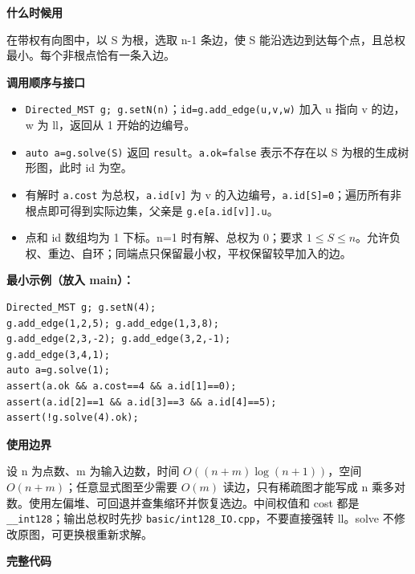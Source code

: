 \documentclass[UTF8,a4paper,10pt]{ctexart}
\newcommand{\TemplUsage}[1]{\textbf{什么时候用}\par #1\par}
\newcommand{\TemplApi}[1]{\textbf{调用顺序与接口}\par #1\par}
\newcommand{\TemplNote}[1]{\textbf{使用边界}\par #1\par}
\begin{document}
\TemplUsage{在带权有向图中，以 S 为根，选取 n-1 条边，使 S 能沿选边到达每个点，且总权最小。每个非根点恰有一条入边。}
\TemplApi{\begin{itemize}
\item \texttt{Directed\_MST g; g.setN(n)}；\texttt{id=g.add\_edge(u,v,w)} 加入 u 指向 v 的边，w 为 ll，返回从 1 开始的边编号。
\item \texttt{auto a=g.solve(S)} 返回 \texttt{result}。\texttt{a.ok=false} 表示不存在以 S 为根的生成树形图，此时 id 为空。
\item 有解时 \texttt{a.cost} 为总权，\texttt{a.id[v]} 为 v 的入边编号，\texttt{a.id[S]=0}；遍历所有非根点即可得到实际边集，父亲是 \texttt{g.e[a.id[v]].u}。
\item 点和 id 数组均为 1 下标。n=1 时有解、总权为 0；要求 $1\le S\le n$。允许负权、重边、自环；同端点只保留最小权，平权保留较早加入的边。
\end{itemize}}
\textbf{最小示例（放入 main）：}
\begin{lstlisting}
Directed_MST g; g.setN(4);
g.add_edge(1,2,5); g.add_edge(1,3,8);
g.add_edge(2,3,-2); g.add_edge(3,2,-1);
g.add_edge(3,4,1);
auto a=g.solve(1);
assert(a.ok && a.cost==4 && a.id[1]==0);
assert(a.id[2]==1 && a.id[3]==3 && a.id[4]==5);
assert(!g.solve(4).ok);
\end{lstlisting}
\TemplNote{设 n 为点数、m 为输入边数，时间 $O((n+m)\log(n+1))$，空间 $O(n+m)$；任意显式图至少需要 $O(m)$ 读边，只有稀疏图才能写成 n 乘多对数。使用左偏堆、可回退并查集缩环并恢复选边。中间权值和 cost 都是 \texttt{\_\_int128}；输出总权时先抄 \texttt{basic/int128\_IO.cpp}，不要直接强转 ll。solve 不修改原图，可更换根重新求解。}
\textbf{完整代码}
\end{document}
